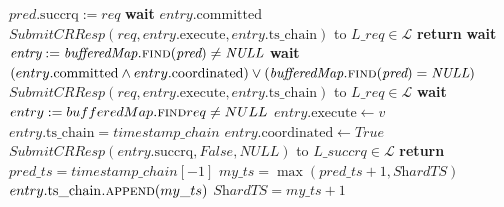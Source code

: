 \begin{algorithm}[!tb]
  \caption{Ellis\_Linear Leader Continued}
  \label{ellis-lin-leaderprotocol-continued}
  \begin{algorithmic}[1]
      \Statex {}
      \State $pred.\mathrm{succrq} := \textit{req}$
        \State \textbf{wait} $entry.\mathrm{committed}$
        \State $\textit{SubmitCRResp}(\textit{req}, entry.\mathrm{execute}, entry.\mathrm{ts\_chain})$ to $L\_{req} \in \mathcal{L}$
        \State \textbf{return}
        \EndIf
      \State \textbf{wait} $\textit{entry} := \textit{bufferedMap}\textsc{.find}(\textit{pred}) \neq \textit{NULL}$
      \State \textbf{wait} $(entry.\mathrm{committed} \land entry.\mathrm{coordinated}) \lor (\textit{bufferedMap}\textsc{.find}(\textit{pred}) = \textit{NULL})$
      \State $\textit{SubmitCRResp}(\textit{req}, entry.\mathrm{execute}, entry.\mathrm{ts\_chain})$ to $L\_{req} \in \mathcal{L}$
      \EndProcedure
      \State \textbf{wait} $entry := bufferedMap\textsc{.find}{req} \neq NULL$
      \State $entry.\mathrm{execute} \gets \textit{v}$
      \State $entry.\mathrm{ts\_chain} = timestamp\_chain$
      \State $entry.\mathrm{coordinated} \gets \textit{True}$
          \State $\textit{SubmitCRResp}(entry.\mathrm{succrq}, False, NULL)$ to $L\_{succrq} \in \mathcal{L}$
          \State \textbf{return}
          \EndIf
        \label{ts_assignment_pt1}
        \State $pred\_ts = timestamp\_chain[-1]$
        \State $\textit{my\_ts} = \max(\textit{pred\_ts}+1, \textit{ShardTS})$
        \State $entry.\mathrm{ts\_chain}\textsc{.append}(my\_ts)$
        \label{ts_assignment_pt2}
        \State $\textit{ShardTS} = \textit{my\_ts}+1$

\end{algorithmic}
\end{algorithm}
